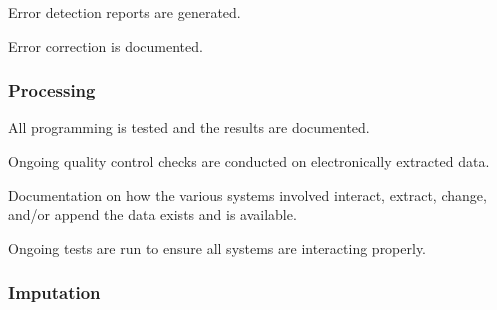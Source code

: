 \begin{QandA}
\begin{answered}
    \end{answered}

    \item Error detection reports are generated.
    \begin{answered}
        
    \end{answered}

    \item Error correction is documented.
    \begin{answered}
        
    \end{answered}

\end{QandA}

\subsubsection{Processing}

\begin{QandA}
    \item All programming is tested and the results are documented.
    \begin{answered}
        
    \end{answered}

    \item Ongoing quality control checks are conducted on electronically extracted data.
    \begin{answered}
        
    \end{answered}

    \item Documentation on how the various systems involved interact, extract, change, and/or append the data exists and is available.
    \begin{answered}
        
    \end{answered}

    \item Ongoing tests are run to ensure all systems are interacting properly.
    \begin{answered}
        
    \end{answered}

\end{QandA}

\subsubsection{Imputation}

